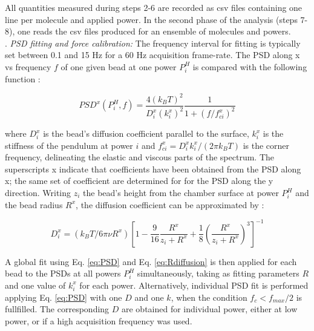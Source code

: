 \documentclass{biophys-new}
\begin{document}
All quantities measured during steps 2-6 are recorded as csv files containing one line per molecule and applied power. In the second phase of the analysis (steps 7-8), one reads the csv files produced for an ensemble of molecules and powers.\\

. \textit{ PSD fitting and force calibration:}
The frequency interval for fitting is typically set between 0.1 and 15 Hz for a 60 Hz acquisition frame-rate. The PSD along x vs frequency $f$ of one given bead at one power $P^H_i$ is compared with the following function \cite{daldrop2015}:

\begin{equation}
\label{eq:PSD}
PSD^x(P^H_i, f) = \dfrac{4 (k_B T)^2}{D^x_i (k^x_i)^2} \frac{1}{ 1+ (f / f^x_{ci})^2}
\end{equation}

\noindent where $D^x_i$ is the bead's diffusion coefficient parallel to the surface, $k^x_i$ is the stiffness of the pendulum at power $i$ and $f^x_{ci} = D^x_i k^x_i/( 2\pi k_B T )$ is the corner frequency, delineating the elastic and viscous parts of the spectrum. The superscripts x indicate that coefficients have been obtained from the PSD along x; the same set of coefficient are determined for for the PSD along the y direction.
Writing $z_{i}$  the bead's height from the chamber surface at power $P^H_i$ and the bead radius $R^x$, the diffusion coefficient can be approximated by \cite{schaffer2007}:

\begin{equation}
\label{eq:Rdiffusion}
D^x_i = ( k_B T / 6\pi \nu R^x ) \left[  1 - \frac{9}{16}\frac{R^x}{z_{i}+R^x} + \frac{1}{8} \left( \frac{R^x}{z_{i}+R^x} \right)^3 \right]^{-1}
\end{equation}

A global fit using Eq. \ref{eq:PSD} and Eq. \ref{eq:Rdiffusion} is then applied for each bead to the PSDs at all powers $P^H_i$ simultaneously, taking as fitting parameters $R$ and one value of $k^x_i$ for each power. Alternatively, individual PSD fit is performed applying Eq. \ref{eq:PSD} with one $D$ and one $k$, when the condition $f_c < f_{max}/2$ is fullfilled. The corresponding $D$ are obtained for individual power, either at low power, or if a high acquisition frequency was used.%
\end{document}
